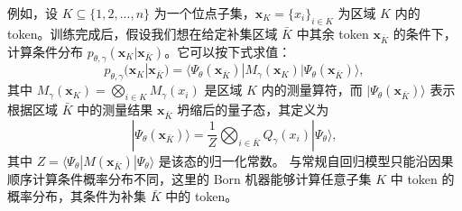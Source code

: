 \documentclass[aps,prb,twocolumn,superscriptaddress]{revtex4-2}
\newcommand{\bra}[1]{\langle #1|}
\newcommand{\ket}[1]{|#1 \rangle}
\newcommand{\vect}[1]{{\bm{#1}}}
\newcommand{\yzy}[1]{{\color[rgb]{0.70,0.13,0.13}{\textsf{YZY}: #1}}}
\newcommand{\hwd}[1]{{\color[rgb]{0.20,0.18,0.8}{\textsf{HWD}: #1}}}
\begin{document}
例如，设 $K\subseteq\{1,2,...,n\}$ 为一个位点子集，$\vect{x}_{K}=\{x_i\}_{i\in K}$ 为区域 $K$ 内的 token。训练完成后，假设我们想在给定补集区域 $\bar{K}$ 中其余 token $\vect{x}_{\bar{K}}$ 的条件下，计算条件分布 $p_{\theta,\gamma}(\vect{x}_K|\vect{x}_{\bar{K}})$。它可以按下式求值：
\begin{equation}\label{eq: single site}
    p_{\theta,\gamma}(\vect{x}_K|\vect{x}_{\bar{K}})=\bra{\Psi_\theta(\vect{x}_{\bar{K}})}M_{\gamma}(\vect{x}_K)\ket{\Psi_\theta(\vect{x}_{\bar{K}})},
\end{equation}
其中 $M_{\gamma}(\vect{x}_K)=\bigotimes_{i\in K}M_{\gamma}(x_i)$ 是区域 $K$ 内的测量算符，而 $\ket{\Psi_\theta(\vect{x}_{\bar{K}})}$ 表示根据区域 $\bar{K}$ 中的测量结果 $\vect{x}_{\bar{K}}$ 坍缩后的量子态，其定义为
\begin{equation}
\ket{\Psi_\theta(\vect{x}_{\bar{K}})}=\frac{1}{Z}\bigotimes_{i\in\bar{K}}Q_{\gamma}(x_i)\ket{\Psi_{\theta}},
\end{equation}
其中 $Z=\bra{\Psi_\theta}M(\vect{x}_{\bar{K}})\ket{\Psi_\theta}$ 是该态的归一化常数。
与常规自回归模型只能沿因果顺序计算条件概率分布不同，这里的 Born 机器能够计算任意子集 $K$ 中 token 的概率分布，其条件为补集 $\bar{K}$ 中的 token。
\end{document}

